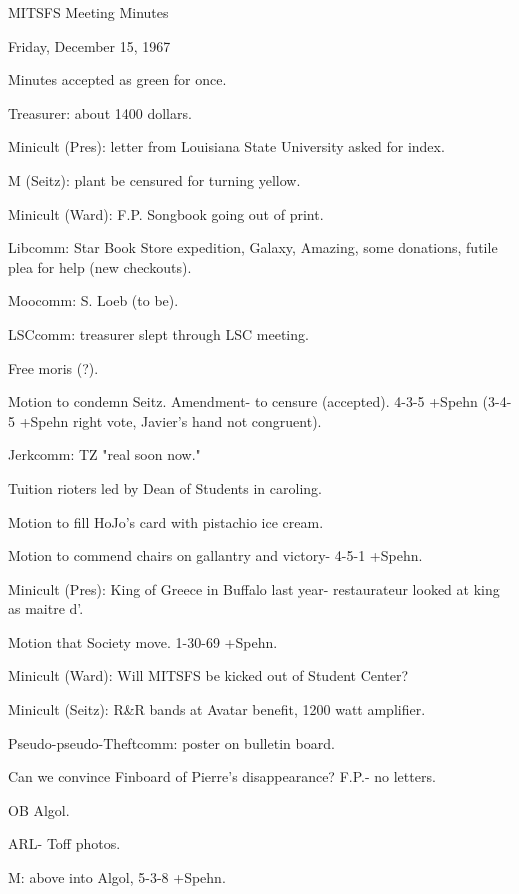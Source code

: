 \documentclass[12pt]{article}
\begin{document}
\begin{center}

MITSFS Meeting Minutes

Friday, December 15, 1967

\end{center}
 
\vspace{12pt}

\setlength{\parskip}{6pt}

\noindent
Minutes accepted as green for once.

Treasurer: about 1400 dollars.

Minicult (Pres): letter from Louisiana State University asked for index.

M (Seitz): plant be censured for turning yellow.

Minicult (Ward): F.P. Songbook going out of print.

Libcomm: Star Book Store expedition, Galaxy, Amazing, some donations, futile plea for help (new checkouts).

Moocomm: S. Loeb (to be).

LSCcomm: treasurer slept through LSC meeting.

Free moris (?).

Motion to condemn Seitz. Amendment- to censure (accepted). 4-3-5 +Spehn (3-4-5 +Spehn right vote, Javier's hand not congruent).

Jerkcomm: TZ "real soon now."

Tuition rioters led by Dean of Students in caroling.

Motion to fill HoJo's card with pistachio ice cream.

Motion to commend chairs on gallantry and victory- 4-5-1 +Spehn.

Minicult (Pres): King of Greece in Buffalo last year- restaurateur looked at king as maitre d'.

Motion that Society move. 1-30-69 +Spehn.

Minicult (Ward): Will MITSFS be kicked out of Student Center?

Minicult (Seitz): R&R bands at Avatar benefit, 1200 watt amplifier.

Pseudo-pseudo-Theftcomm: poster on bulletin board.

Can we convince Finboard of Pierre's disappearance? F.P.- no letters.

OB Algol.

ARL- Toff photos.

M: above into Algol, 5-3-8 +Spehn.
\end{document}
